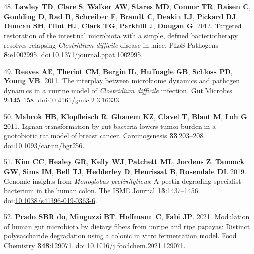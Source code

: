 \documentclass[
  12pt,
]{article}
\newenvironment{cslreferences}%
  {}%
  {\par}
\begin{document}
\begin{cslreferences}
\leavevmode\hypertarget{ref-Lawley2012}{}%
48. \textbf{Lawley TD}, \textbf{Clare S}, \textbf{Walker AW},
\textbf{Stares MD}, \textbf{Connor TR}, \textbf{Raisen C},
\textbf{Goulding D}, \textbf{Rad R}, \textbf{Schreiber F},
\textbf{Brandt C}, \textbf{Deakin LJ}, \textbf{Pickard DJ},
\textbf{Duncan SH}, \textbf{Flint HJ}, \textbf{Clark TG},
\textbf{Parkhill J}, \textbf{Dougan G}. 2012. Targeted restoration of
the intestinal microbiota with a simple, defined bacteriotherapy
resolves relapsing \emph{Clostridium difficile} disease in mice. PLoS
Pathogens \textbf{8}:e1002995.
doi:\href{https://doi.org/10.1371/journal.ppat.1002995}{10.1371/journal.ppat.1002995}.

\leavevmode\hypertarget{ref-Reeves2011}{}%
49. \textbf{Reeves AE}, \textbf{Theriot CM}, \textbf{Bergin IL},
\textbf{Huffnagle GB}, \textbf{Schloss PD}, \textbf{Young VB}. 2011. The
interplay between microbiome dynamics and pathogen dynamics in a murine
model of \emph{Clostridium difficile} infection. Gut Microbes
\textbf{2}:145--158.
doi:\href{https://doi.org/10.4161/gmic.2.3.16333}{10.4161/gmic.2.3.16333}.

\leavevmode\hypertarget{ref-Mabrok2011}{}%
50. \textbf{Mabrok HB}, \textbf{Klopfleisch R}, \textbf{Ghanem KZ},
\textbf{Clavel T}, \textbf{Blaut M}, \textbf{Loh G}. 2011. Lignan
transformation by gut bacteria lowers tumor burden in a gnotobiotic rat
model of breast cancer. Carcinogenesis \textbf{33}:203--208.
doi:\href{https://doi.org/10.1093/carcin/bgr256}{10.1093/carcin/bgr256}.

\leavevmode\hypertarget{ref-Kim2019}{}%
51. \textbf{Kim CC}, \textbf{Healey GR}, \textbf{Kelly WJ},
\textbf{Patchett ML}, \textbf{Jordens Z}, \textbf{Tannock GW},
\textbf{Sims IM}, \textbf{Bell TJ}, \textbf{Hedderley D},
\textbf{Henrissat B}, \textbf{Rosendale DI}. 2019. Genomic insights from
\emph{Monoglobus pectinilyticus}: A pectin-degrading specialist
bacterium in the human colon. The ISME Journal \textbf{13}:1437--1456.
doi:\href{https://doi.org/10.1038/s41396-019-0363-6}{10.1038/s41396-019-0363-6}.

\leavevmode\hypertarget{ref-doPrado2021}{}%
52. \textbf{Prado SBR do}, \textbf{Minguzzi BT}, \textbf{Hoffmann C},
\textbf{Fabi JP}. 2021. Modulation of human gut microbiota by dietary
fibers from unripe and ripe papayas: Distinct polysaccharide degradation
using a colonic in vitro fermentation model. Food Chemistry
\textbf{348}:129071.
doi:\href{https://doi.org/10.1016/j.foodchem.2021.129071}{10.1016/j.foodchem.2021.129071}.


\end{cslreferences}
\end{document}

